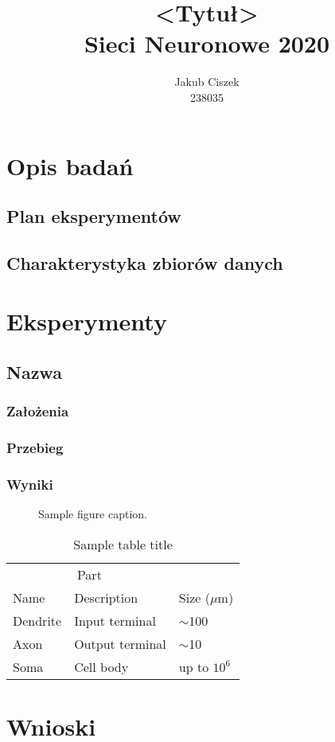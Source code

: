 \documentclass{article}
\title{  <Tytuł>\\Sieci Neuronowe 2020 }
\author{
  Jakub Ciszek \\
  238035\\
}
\begin{document}
\maketitle

\newpage
\tableofcontents
\newpage

\section{Opis badań}

\subsection{Plan eksperymentów}
\subsection{Charakterystyka zbiorów danych}


\section{Eksperymenty}

\subsection{Nazwa}
\subsubsection*{Założenia}
\subsubsection*{{Przebieg}}
\subsubsection*{Wyniki}

\begin{figure}[h]
	\centering
	\fbox{\rule[-.5cm]{0cm}{4cm} \rule[-.5cm]{4cm}{0cm}}
	\caption{Sample figure caption.}
\end{figure}

\begin{table}[h]
	\caption{Sample table title}
	\label{sample-table}
	\centering
	\begin{tabular}{lll}
		\toprule
		\multicolumn{2}{c}{Part}                   \\
		\cmidrule{1-2}
		Name     & Description     & Size ($\mu$m) \\
		\midrule
		Dendrite & Input terminal  & $\sim$100     \\
		Axon     & Output terminal & $\sim$10      \\
		Soma     & Cell body       & up to $10^6$  \\
		\bottomrule
	\end{tabular}
\end{table}

\section{Wnioski}
\end{document}

